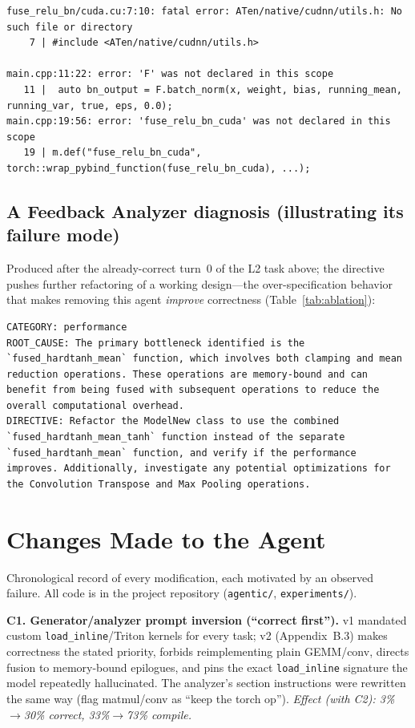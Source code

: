 \documentclass[conference]{IEEEtran}
\begin{document}
\begin{lstlisting}
fuse_relu_bn/cuda.cu:7:10: fatal error: ATen/native/cudnn/utils.h: No such file or directory
    7 | #include <ATen/native/cudnn/utils.h>

main.cpp:11:22: error: 'F' was not declared in this scope
   11 |  auto bn_output = F.batch_norm(x, weight, bias, running_mean, running_var, true, eps, 0.0);
main.cpp:19:56: error: 'fuse_relu_bn_cuda' was not declared in this scope
   19 | m.def("fuse_relu_bn_cuda", torch::wrap_pybind_function(fuse_relu_bn_cuda), ...);
\end{lstlisting}

\subsection{A Feedback Analyzer diagnosis (illustrating its failure mode)}
Produced after the already-correct turn~0 of the L2 task above; the directive
pushes further refactoring of a working design---the over-specification behavior
that makes removing this agent \emph{improve} correctness (Table~\ref{tab:ablation}):

\begin{lstlisting}
CATEGORY: performance
ROOT_CAUSE: The primary bottleneck identified is the `fused_hardtanh_mean` function, which involves both clamping and mean reduction operations. These operations are memory-bound and can benefit from being fused with subsequent operations to reduce the overall computational overhead.
DIRECTIVE: Refactor the ModelNew class to use the combined `fused_hardtanh_mean_tanh` function instead of the separate `fused_hardtanh_mean` function, and verify if the performance improves. Additionally, investigate any potential optimizations for the Convolution Transpose and Max Pooling operations.
\end{lstlisting}

\section{Changes Made to the Agent}

Chronological record of every modification, each motivated by an observed failure.
All code is in the project repository (\texttt{agentic/}, \texttt{experiments/}).

\textbf{C1. Generator/analyzer prompt inversion (``correct first'').}
v1 mandated custom \texttt{load\_inline}/Triton kernels for every task; v2
(Appendix~B.3) makes correctness the stated priority, forbids reimplementing plain
GEMM/conv, directs fusion to memory-bound epilogues, and pins the exact
\texttt{load\_inline} signature the model repeatedly hallucinated. The analyzer's
section instructions were rewritten the same way (flag matmul/conv as ``keep the
torch op''). \emph{Effect (with C2): 3\%$\to$30\% correct, 33\%$\to$73\% compile.}
\end{document}
